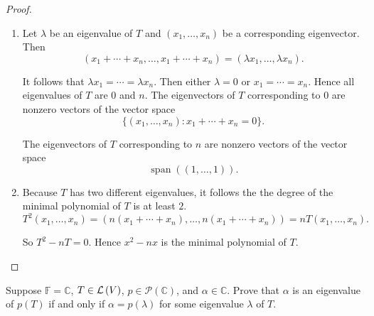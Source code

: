\begin{proof}
    \begin{enumerate}[label={(\alph*)}]
        \item Let $\lambda$ be an eigenvalue of $T$ and $(x_{1}, \ldots, x_{n})$ be a corresponding eigenvector. Then
              \[
                  (x_{1} + \cdots + x_{n}, \ldots, x_{1} + \cdots + x_{n}) = (\lambda x_{1}, \ldots, \lambda x_{n}).
              \]

              It follows that $\lambda x_{1} = \cdots = \lambda x_{n}$. Then either $\lambda = 0$ or $x_{1} = \cdots = x_{n}$. Hence all eigenvalues of $T$ are $0$ and $n$. The eigenvectors of $T$ corresponding to $0$ are nonzero vectors of the vector space
              \[
                  \{ (x_{1}, \ldots, x_{n}): x_{1} + \cdots + x_{n} = 0 \}.
              \]

              The eigenvectors of $T$ corresponding to $n$ are nonzero vectors of the vector space
              \[
                  \operatorname{span}((1, \ldots, 1)).
              \]
        \item Because $T$ has two different eigenvalues, it follows the the degree of the minimal polynomial of $T$ is at least $2$.
              \[
                  T^{2}(x_{1}, \ldots, x_{n}) = (n(x_{1} + \cdots + x_{n}), \ldots, n(x_{1} + \cdots + x_{n})) = nT(x_{1}, \ldots, x_{n}).
              \]

              So $T^{2} - nT = 0$. Hence $x^{2} - nx$ is the minimal polynomial of $T$.
    \end{enumerate}
\end{proof}
\newpage

\begin{exercise}
    Suppose $\mathbb{F} = \mathbb{C}$, $T\in\mathcal{L}\left({V}\right)$, $p\in\mathscr{P}(\mathbb{C})$, and $\alpha\in\mathbb{C}$. Prove that $\alpha$ is an eigenvalue of $p(T)$ if and only if $\alpha = p(\lambda)$ for some eigenvalue $\lambda$ of $T$.
\end{exercise}

